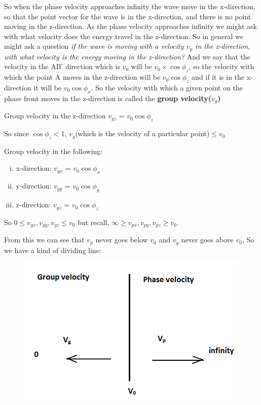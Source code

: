 So when the phase velocity approaches infinity the wave move in the x-direction, so that the point vector for the wave is in the x-direction, and there is no point moving in the z-direction.
As the phase velocity approaches infinity we might ask with what velocity does the energy travel in the z-direction.
So in general we might ask a question \emph{if the wave is moving with a velocity $v_p$ in the z-direction, with what velocity is the energy moving in the z-direction?}
And we say that the velocity in the AB' direction which is $v_0$ will be $v_0\times\cos\phi_{z}$, so the velocity with which the point A moves in the z-direction will be $v_0\cos\phi_{z}$ and if it is in the x-direction it will be $v_0\cos\phi_{x}$. So the velocity with which a given point on the phase front moves in the z-direction is called the \textbf{group velocity($v_g$)}

\begin{center}
Group velocity in the z-direction
$v_{gz}$ = $v_0\cos\phi_{z}$
\end{center}
So since $\cos\phi_{z} < 1$, $v_g$(which is the velocity of a particular point)$\leq v_0$


Group velocity in the following:
\begin{enumerate}[(i)]
\item x-direction:	$v_{gx}$ = $v_0\cos\phi_{x}$
\item y-direction: 	$v_{gy}$ = $v_0\cos\phi_{y}$
\item z-direction:	$v_{gz}$ = $v_0\cos\phi_{z}$
\end{enumerate}

So $0\leq v_{gx},v_{gy},v_{gz} \leq v_0$ but recall, $\infty\geq v_{px},v_{py},v_{pz} \geq v_0$.

From this we can see that $v_p$ never goes below $v_0$ and $v_g$ never goes above $v_0$,
So we have a kind of dividing line:
\begin{figure}[h]
\centering
\includegraphics[width=.8\linewidth]{./graphics/img3}
\caption{}
\end{figure}

